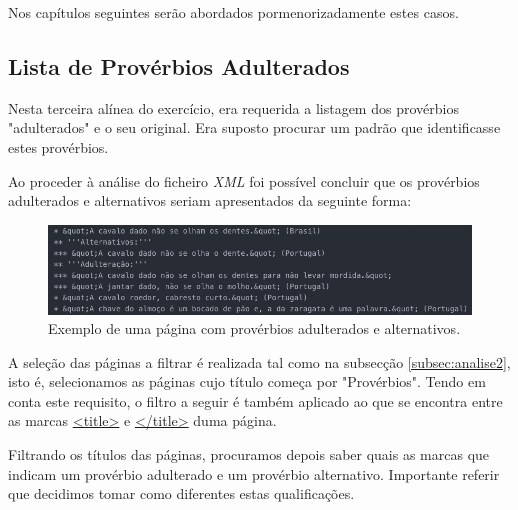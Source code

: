 \documentclass[11pt,a4paper]{report}
\begin{document}
Nos capítulos seguintes serão abordados pormenorizadamente estes casos.


\subsection{Lista de Provérbios Adulterados}

Nesta terceira alínea do exercício, era requerida a listagem dos provérbios "adulterados" e o seu original. Era suposto procurar um padrão que identificasse estes provérbios.

Ao proceder à análise do ficheiro \textit{XML} foi possível concluir que os provérbios adulterados e alternativos seriam apresentados da seguinte forma:

\begin{figure}[H]
\centering
\includegraphics[scale=0.60]{pagina_adulterados.png}
\caption{Exemplo de uma página com provérbios adulterados e alternativos.}
\label{img:pagina_adulterados}
\end{figure}

A seleção das páginas a filtrar é realizada tal como na subsecção \ref{subsec:analise2}, isto é, selecionamos as páginas cujo título começa por "Provérbios". Tendo em conta este requisito, o filtro a seguir é também aplicado ao que se encontra entre as marcas \underline{<title>} e \underline{</title>} duma página.

Filtrando os títulos das páginas, procuramos depois saber quais as marcas que indicam um provérbio adulterado e um provérbio alternativo. Importante referir que decidimos tomar como diferentes estas qualificações.

\vspace{0.2cm}
\end{document}
